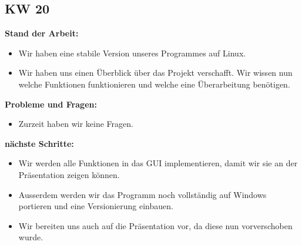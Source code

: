 \documentclass[10pt,paper=a4,final]{scrartcl}
\begin{document}
\subsection{KW 20}
\begin{description}
  \item {\bf Stand der Arbeit: } \\
    \begin{itemize}
      \item Wir haben eine stabile Version unseres Programmes auf Linux.
      \item Wir haben uns einen Überblick über das Projekt verschafft. Wir wissen nun welche Funktionen funktionieren und welche eine Überarbeitung benötigen.
    \end{itemize}
  \item {\bf Probleme und Fragen: } \\
    \begin{itemize}
      \item Zurzeit haben wir keine Fragen.
    \end{itemize}
  \item {\bf nächste Schritte: } \\
    \begin{itemize}
      \item Wir werden alle Funktionen in das GUI implementieren, damit wir sie an der Präsentation zeigen können.
      \item Ausserdem werden wir das Programm noch vollständig auf Windows portieren und eine Versionierung einbauen.
      \item Wir bereiten uns auch auf die Präsentation vor, da diese nun vorverschoben wurde.
    \end{itemize}
\end{description}
\end{document}
